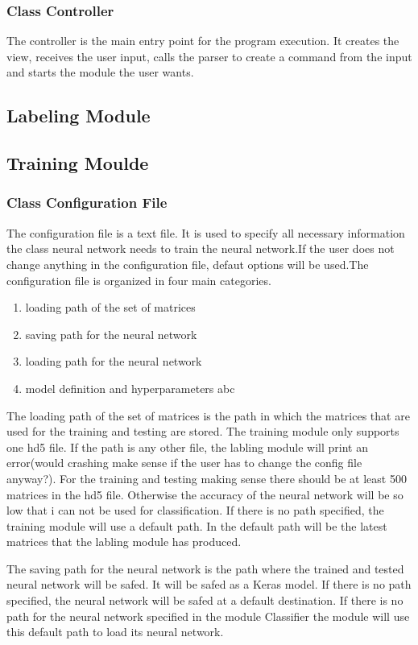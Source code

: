\documentclass[parskip=full]{scrartcl}
\begin{document}
\subsubsection{Class Controller} 
The controller is the main entry point for the program execution. It creates the view, receives the user input, calls the parser to create a command from the input and starts the module the user wants.

\subsection{Labeling Module}
\subsection{Training Moulde}
\subsubsection{Class Configuration File}
The configuration file is a text file. It is used to specify all necessary information the class neural network needs to train the neural network.If the user does not change anything in the configuration file, defaut options will be used.The configuration file is organized in four main categories. 
\begin{enumerate}
\item loading path of the set of matrices 
\item saving path for the neural network
\item loading path for the neural network
\item model definition and hyperparameters abc
\end{enumerate}
The loading path of the set of matrices is the path in which the matrices that are used for the training and testing are stored. The training module only supports one hd5 file. If the path is any other file, the labling module will print an error(would crashing make sense if the user has to change the config file anyway?). For the training and testing making sense there should be at least 500 matrices in the hd5 file. Otherwise the accuracy of the neural network will be so low that i can not be used for classification. If there is no path specified, the training module will use a default path. In the default path will be the latest matrices that the labling module has produced. \newline

The saving path for the neural network is the path where the trained and tested neural network will be safed. It will be safed as a Keras model. If there is no path specified, the neural network will be safed at a default destination. If there is no path for the neural network specified in the module Classifier the module will use this default path to load its neural network.\newline
\end{document}
